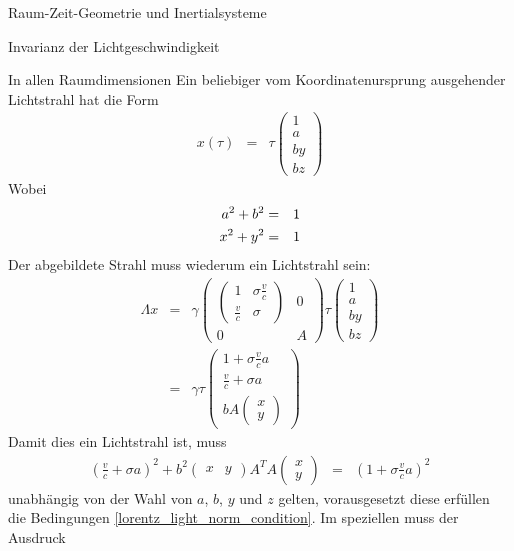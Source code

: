 \begin{chapter}{\titlestr}
\begin{section}{Raum-Zeit-Geometrie und Inertialsysteme}
\begin{subsection}{Invarianz der Lichtgeschwindigkeit}
\begin{subsubsection}{In allen Raumdimensionen}
Ein beliebiger vom Koordinatenursprung ausgehender Lichtstrahl hat die Form
\begin{eqnarray*}
x(\tau) &=&
\tau
\begin{pmatrix}
1\\
a\\
by\\
bz
\end{pmatrix}
\end{eqnarray*}
Wobei
\begin{eqnarray}
\label{lorentz_light_norm_condition}
a^2+b^2 &=& 1\cr
x^2+y^2 &=& 1
\end{eqnarray}
Der abgebildete Strahl muss wiederum ein Lichtstrahl sein:
\begin{eqnarray*}
\Lambda x &=& \gamma
\begin{pmatrix}
\begin{pmatrix}
1 & \sigma\frac{v}{c}\\
\frac{v}{c} & \sigma
\end{pmatrix} & 0\\
0 & A
\end{pmatrix}
\tau
\begin{pmatrix}
1\\
a\\
by\\
bz
\end{pmatrix}\\
&=&
\gamma\tau
\begin{pmatrix}
1+\sigma\frac{v}{c}a\\
\frac{v}{c}+\sigma a\\
bA\begin{pmatrix}
x\\y
\end{pmatrix}
\end{pmatrix}
\end{eqnarray*}
Damit dies ein Lichtstrahl ist, muss
\begin{eqnarray*}
\left(\frac{v}{c}+\sigma a\right)^2+b^2
\begin{pmatrix}
x&y
\end{pmatrix}
A^TA\begin{pmatrix}
x\\y
\end{pmatrix}
&=&
\left(1+\sigma\frac{v}{c}a\right)^2
\end{eqnarray*}
unabhängig von der Wahl von $a$, $b$, $y$ und $z$ gelten, vorausgesetzt diese erfüllen die Bedingungen \ref{lorentz_light_norm_condition}. Im speziellen muss der Ausdruck

\end{subsubsection}
\end{subsection}
\end{section}
\end{chapter}
